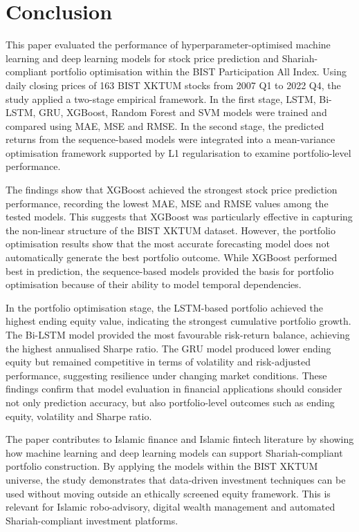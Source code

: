 \section{Conclusion}

This paper evaluated the performance of hyperparameter-optimised machine learning and deep learning models for stock price prediction and Shariah-compliant portfolio optimisation within the BIST Participation All Index. Using daily closing prices of 163 BIST XKTUM stocks from 2007 Q1 to 2022 Q4, the study applied a two-stage empirical framework. In the first stage, LSTM, Bi-LSTM, GRU, XGBoost, Random Forest and SVM models were trained and compared using MAE, MSE and RMSE. In the second stage, the predicted returns from the sequence-based models were integrated into a mean-variance optimisation framework supported by L1 regularisation to examine portfolio-level performance.

The findings show that XGBoost achieved the strongest stock price prediction performance, recording the lowest MAE, MSE and RMSE values among the tested models. This suggests that XGBoost was particularly effective in capturing the non-linear structure of the BIST XKTUM dataset. However, the portfolio optimisation results show that the most accurate forecasting model does not automatically generate the best portfolio outcome. While XGBoost performed best in prediction, the sequence-based models provided the basis for portfolio optimisation because of their ability to model temporal dependencies.

In the portfolio optimisation stage, the LSTM-based portfolio achieved the highest ending equity value, indicating the strongest cumulative portfolio growth. The Bi-LSTM model provided the most favourable risk-return balance, achieving the highest annualised Sharpe ratio. The GRU model produced lower ending equity but remained competitive in terms of volatility and risk-adjusted performance, suggesting resilience under changing market conditions. These findings confirm that model evaluation in financial applications should consider not only prediction accuracy, but also portfolio-level outcomes such as ending equity, volatility and Sharpe ratio.

The paper contributes to Islamic finance and Islamic fintech literature by showing how machine learning and deep learning models can support Shariah-compliant portfolio construction. By applying the models within the BIST XKTUM universe, the study demonstrates that data-driven investment techniques can be used without moving outside an ethically screened equity framework. This is relevant for Islamic robo-advisory, digital wealth management and automated Shariah-compliant investment platforms.

